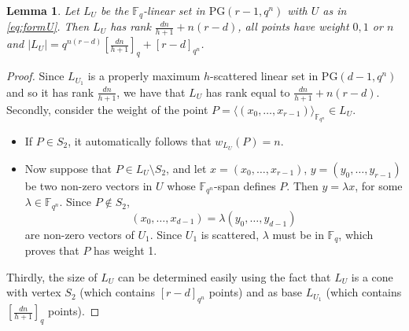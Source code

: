 \documentclass[11pt]{amsart}
\newtheorem{lemma}[theorem]{Lemma}
\newcommand{\fqn}{\mathbb{F}_{q^n}}
\newcommand{\F}{{\mathbb F}}
\newcommand{\fq}{{\mathbb F}_{q}}
\newcommand{\PG}{\mathrm{PG}}
\begin{document}
\begin{lemma}\label{le:linset}
Let $L_U$ be the $\F_q$-linear set in $\PG(r-1,q^n)$ with $U$ as in \eqref{eq:formU}. Then $L_U$ has rank $\frac{dn}{h+1}+n(r-d)$, all points have weight $0,1$ or $n$ and $|L_U|=q^{n(r-d)}\left[\frac{dn}{h+1}\right]_q+\left[ r-d
 \right]_{q^n}$.%
\end{lemma}
\begin{proof}
Since $L_{U_1}$ is a properly maximum $h$-scattered linear set in $\PG(d-1,q^n)$ and so it has rank $\frac{dn}{h+1}$, we have that $L_U$ has rank equal to $\frac{dn}{h+1}+n(r-d)$.
Secondly, consider the weight of the point $P=\langle (x_0,\ldots,x_{r-1}) \rangle_{\F_{q^n}} \in L_U$.
\begin{itemize}
    \item If $P \in S_2$, it automatically follows that $w_{L_U}(P)=n$.
    \item Now suppose that $P \in L_U \setminus S_2$, and let $x=(x_0, \dots, x_{r-1})$, $y=(y_0, \dots, y_{r-1})$ be two non-zero vectors in $U$ whose $\fqn$-span defines $P$.
    Then $y = \lambda x$, for some $\lambda \in \fqn$.
    Since $P \notin S_2$,
    \[
     (x_0, \dots, x_{d-1}) = \lambda (y_0, \dots, y_{d-1})
    \]
    are non-zero vectors of $U_1$.
    Since $U_1$ is scattered, $\lambda$ must be in $\fq$, which proves that $P$ has weight 1.
\end{itemize}
Thirdly, the size of $L_U$ can be determined easily using the fact that $L_U$ is a cone with vertex $S_2$ (which contains %
$[r-d]_{q^n}$
points) and as base $L_{U_1}$ (which contains %
$\left[\frac{dn}{h+1}\right]_q$ points).
\end{proof}
\end{document}
